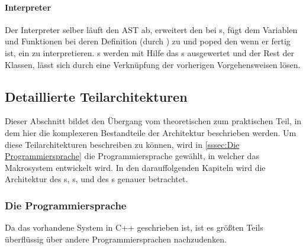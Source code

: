 {      \paragraph{Interpreter}
        Der Interpreter selber läuft den AST ab, erweitert den  bei s, fügt dem  Variablen und Funktionen bei deren Definition (durch ) zu und poped den  wenn er fertig ist, ein  zu interpretieren. s werden mit Hilfe das s ausgewertet und der Rest der  Klassen, lässt sich durch eine Verknüpfung der vorherigen Vorgehensweisen lösen.

  \subsection{Detaillierte Teilarchitekturen}
  \label{ssec:Detaillierte Teilarchitekturen}
    Dieser Abschnitt bildet den Übergang vom theoretischen zum praktischen Teil, in dem hier die komplexeren Bestandteile der Architektur beschrieben werden. Um diese Teilarchitekturen beschreiben zu können, wird in \autoref{sssec:Die Programmiersprache} die Programmiersprache gewählt, in welcher das Makrosystem entwickelt wird. In den darauffolgenden Kapiteln wird die Architektur des s, s,  und des s genauer betrachtet.

    \subsubsection{Die Programmiersprache}
    \label{sssec:Die Programmiersprache}
      Da das vorhandene System in C++ geschrieben ist, ist es größten Teils überflüssig über andere Programmiersprachen nachzudenken.

}
